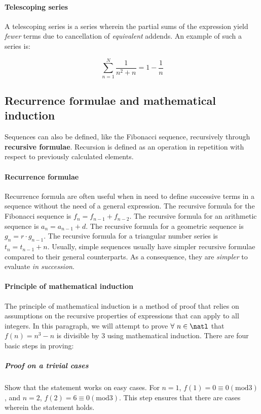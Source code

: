 \paragraph{Telescoping series}
A telescoping series is a series wherein the partial sums of the expression yield \emph{fewer} terms due to cancellation of \emph{equivalent} addends.
An example of such a series is:

\[
  \sum_{n=1}^{N} \dfrac{1}{n^2+n} = 1 - \frac{1}{n}
\]

\subsection{Recurrence formulae and mathematical induction}
Sequences can also be defined, like the Fibonacci sequence, recursively through \textbf{recursive formulae}.
Recursion is defined as an operation in repetition with respect to previously calculated elements.

\paragraph{Recurrence formulae}
Recurrence formula are often useful when in need to define successive terms in a sequence without the need of a general expression.
The recursive formula for the Fibonacci sequence is $f_n = f_{n-1} + f_{n-2}$.
The recursive formula for an arithmetic sequence is $a_n = a_{n-1} + d$.
The recursive formula for a geometric sequence is $g_n = r\cdot g_{n-1}$.
The recursive formula for a triangular number series is $t_n = t_{n-1} + n$.
Usually, simple sequences usually have simpler recursive formulae compared to their general counterparts.
As a consequence, they are \emph{simpler} to evaluate \emph{in succession}.

\paragraph{Principle of mathematical induction}
The principle of mathematical induction is a method of proof that relies on assumptions on the recursive properties of expressions that can apply to all integers.
In this paragraph, we will attempt to prove $\forall\ n \in \natl$ that $f(n) = n^3 - n$ is divisible by $3$ using mathematical induction.
There are four basic steps in proving:

\subparagraph{Proof on a trivial cases}
Show that the statement works on easy cases.
For $n=1$, $f(1) = 0 \equiv 0(\textrm{mod} 3)$, and $n=2$, $f(2) = 6 \equiv 0 (\textrm{mod} 3)$.
This step ensures that there are cases wherein the statement holds.

